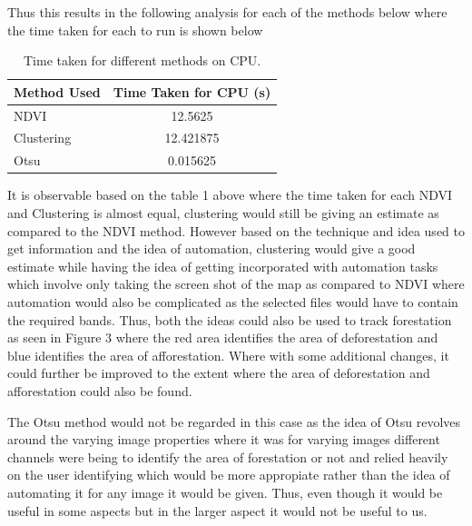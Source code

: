 \documentclass[12pt,a4paper,IEEEtran]{article}
\begin{document}
Thus this results in the following analysis for each of the methods below where the time taken for each to run is shown below  

\begin{table}[h]
	\centering
	\begin{tabular}{|l|c|}
	\hline
	\textbf{Method Used} & \textbf{Time Taken for CPU (s)} \\
	\hline
	NDVI & 12.5625 \\ 
	\hline
	Clustering & 12.421875 \\ 
	\hline
	Otsu & 0.015625 \\
	\hline
	\end{tabular}
	\caption{Time taken for different methods on CPU.}
	\label{tab:methods_time}
\end{table}
	
It is observable based on the table 1 above where the time taken for each NDVI and Clustering is almost equal, clustering would still be giving an estimate as compared to the NDVI method. However based on the technique and idea used to get information and the idea of automation, clustering would give a good estimate while having the idea of getting incorporated with automation tasks which involve only taking the screen shot of the map as compared to NDVI where automation would also be complicated as the selected files would have to contain the required bands. Thus, both the ideas could also be used to track forestation as seen in Figure 3 where the red area identifies the area of deforestation and blue identifies the area of afforestation. Where with some additional changes, it could further be improved to the extent where the area of deforestation and afforestation could also be found. 

The Otsu method would not be regarded in this case as the idea of Otsu revolves around the varying image properties where it was for varying images different channels were being to identify the area of forestation or not and relied heavily on the user identifying which would be more appropiate rather than the idea of automating it for any image it would be given. Thus, even though it would be useful in some aspects but in the larger aspect it would not be useful to us.  
 
\end{document}
